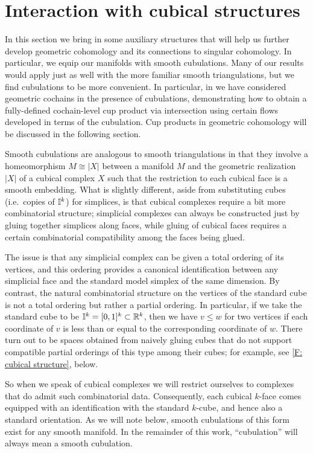 
\section{Interaction with cubical structures}\label{S: transversality}

In this section we bring in some auxiliary structures that will help us further develop geometric cohomology and its connections to singular cohomology.
In particular, we equip our manifolds with smooth cubulations.
Many of our results would apply just as well with the more familiar smooth triangulations, but we find cubulations to be more convenient.
In particular, in \cite{FMS-flows} we have considered geometric cochains in the presence of cubulations, demonstrating how to obtain a fully-defined cochain-level cup product via intersection using certain flows developed in terms of the cubulation.
Cup products in geometric cohomology will be discussed in the following section.

Smooth cubulations are analogous to smooth triangulations in that they involve a homeomorphism $M \cong |X|$ between a manifold $M$ and the geometric realization $|X|$ of a cubical complex $X$ such that the restriction to each cubical face is a smooth embedding.
What is slightly different, aside from substituting cubes (i.e.\ copies of $\mathbb{I}^k$) for simplices, is that cubical complexes require a bit more combinatorial structure; simplicial complexes can always be constructed just by gluing together simplices along faces, while gluing of cubical faces requires a certain combinatorial compatibility among the faces being glued.

The issue is that any simplicial complex can be given a total ordering of its vertices, and this ordering provides a canonical identification between any simplicial face and the standard model simplex of the same dimension.
By contrast, the natural combinatorial structure on the vertices of the standard cube is not a total ordering but rather a partial ordering.
In particular, if we take the standard cube to be $\mathbb{I}^k = [0,1]^k \subset \mathbb{R}^k$, then we have $v \leq w$ for two vertices if each coordinate of $v$ is less than or equal to the corresponding coordinate of $w$.
There turn out to be spaces obtained from naively gluing cubes that do not support compatible partial orderings of this type among their cubes; for example, see \cref{F: cubical structure}, below.

So when we speak of cubical complexes we will restrict ourselves to complexes that do admit such combinatorial data.
Consequently, each cubical $k$-face comes equipped with an identification with the standard $k$-cube, and hence also a standard orientation.
As we will note below, smooth cubulations of this form exist for any smooth manifold.
In the remainder of this work, ``cubulation'' will always mean a smooth cubulation.

